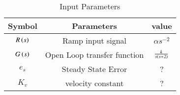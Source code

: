 \setlength{\arrayrulewidth}{0.2mm}
\setlength{\tabcolsep}{15pt}
\renewcommand{\arraystretch}{1.3}


\begin{table}[ht]
  \centering
  \begin{tabular}{|c|c|c|}
    \hline
    	Symbol & Parameters & value\\
    \hline
	  $R\left(s\right)$ & Ramp input signal  &  $\alpha s^{-2}$\\
    \hline
	  $G\left(s\right)$ & Open Loop transfer function &  $\frac{k}{s\left(s+2\right)}$\\
    \hline
         $e_s$ & Steady State Error &  ? \\
    \hline
         $K_v$ & velocity constant &  ? \\
    \hline
  \end{tabular}
  \vspace{0.3cm}
  \caption{Input Parameters}
  \label{tab:2023.EC.41.T1}
\end{table}

